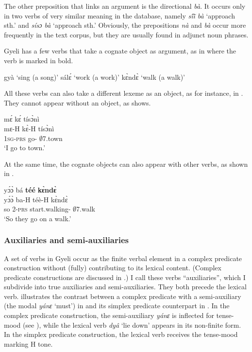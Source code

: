 The other preposition that links an argument is the directional {\itshape bà}. It occurs only in two verbs of very similar meaning in the database, namely {\itshape sĩ́ĩ̀ bà} `approach sth.' and {\itshape sísɔ bà} `approach sth.'
Obviously, the prepositions {\itshape nà} and {\itshape bà} occur more frequently in the text corpus, but they are usually found in adjunct noun phrases.

Gyeli has a few verbs that take a cognate object as argument, as in  where the verb is marked in bold.

\ea \label{Vcognate}
   gyà `sing (a song)'
 sálɛ́ `work (a work)'
 kɛ̀ndɛ̀ `walk (a walk)'
\z
\z

All these verbs can also take a different lexeme as an object, as for instance, in . They cannot appear without an object, as  shows.

\ea \label{Cogn}
  \ea  \label{Cogna}
   \glll  mɛ́ kɛ́ tísɔ̀nì  \\
          mɛ-H kɛ̀-H tísɔ̀nì \\
         1\textsc{sg}-\textsc{prs} go-{\R} $\emptyset$7.town    \\
    \trans `I go to town.'
 \z
\z

At the same time, the cognate objects can also appear with other verbs, as shown in .

\ea \label{CognO}
  \glll yɔ́ɔ̀ bá {\bfseries téé} {\bfseries kɛ̀ndɛ̀} \\
        yɔ́ɔ̀ ba-H téè-H kɛ̀ndɛ̀ \\
         so 2-\textsc{prs} start.walking-{\R} $\emptyset$7.walk   \\
    \trans `So they go on a walk.'
\z



\subsubsection{Auxiliaries and semi-auxiliaries}
\label{sec:AUX}

A set of verbs in Gyeli occur as the finite verbal element in a complex predicate construction without (fully) contributing to its lexical content. (Complex predicate constructions are discussed in .) I call these verbs ``auxiliaries'', which I subdivide into true auxiliaries and semi-auxiliaries.  They both precede the lexical verb.  illustrates the contrast between a complex predicate with a semi-auxiliary (the modal {\itshape yánɛ} `must') in  and its simplex predicate counterpart in . In the complex predicate construction, the semi-auxiliary {\itshape yánɛ} is inflected for tense-mood (see ), while the lexical verb {\itshape dyâ} `lie down' appears in its non-finite form. In the simplex predicate construction, the lexical verb receives the tense-mood marking H tone.

